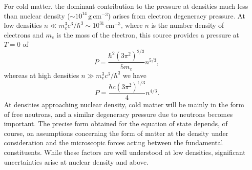 For cold matter, the dominant contribution to the pressure at densities much less
than nuclear density (\(\sim10^{14}\,\mathrm{g\,cm^{-3}}\)) arises from electron
degeneracy pressure. At low densities
\(n\ll m_e^3c^3/\hbar^3\sim10^{31}\,\mathrm{cm^{-3}}\), where \(n\) is the
number density of electrons and \(m_e\) is the mass of the electron, this source
provides a pressure at \(T=0\) of
\begin{equation}
  P=\frac{\hbar^2(3\pi^2)^{2/3}}{5m_e}n^{5/3},
  \tag{6.2.44}\label{eq:6.2.44}
\end{equation}
whereas at high densities \(n\gg m_e^3c^3/\hbar^3\) we have
\begin{equation}
  P=\frac{\hbar c(3\pi^2)^{1/3}}{4}n^{4/3}.
  \tag{6.2.45}\label{eq:6.2.45}
\end{equation}
At densities approaching nuclear density, cold matter will be mainly in the form
of free neutrons, and a similar degeneracy pressure due to neutrons becomes
important. The precise form obtained for the equation of state depends, of course,
on assumptions concerning the form of matter at the density under consideration
and the microscopic forces acting between the fundamental constituents. While
these factors are well understood at low densities, significant uncertainties arise
at nuclear density and above.

